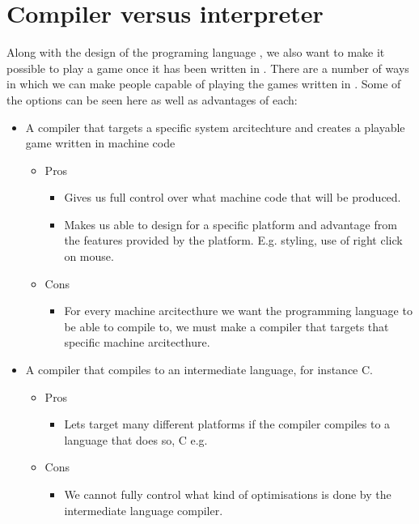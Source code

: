 \section{Compiler versus interpreter}

Along with the design of the programing language \productname{}, we also want to make it possible to play a game once it has been written in \productname{}. There are a number of ways in which we can make people capable of playing the games written in \productname{}. Some of the options can be seen here as well as advantages of each:
\begin{itemize}[noitemsep]
\item A \productname{} compiler that targets a specific system arcitechture and creates a playable game written in machine code
	\begin{itemize}[noitemsep]
	\item Pros
		\begin{itemize}[noitemsep]
		\item Gives us full control over what machine code that will be produced.
		\item Makes us able to design for a specific platform and advantage from the features provided by the platform. E.g. styling, use of right click on mouse.
		\end{itemize}
	\item Cons
		\begin{itemize}[noitemsep]
		\item For every machine arcitecthure we want the \productname{} programming language to be able to compile to, we must make a compiler that targets that specific machine arcitecthure.
		\end{itemize}
	\end{itemize}
\item A \productname{} compiler that compiles to an intermediate language, for instance C.
	\begin{itemize}[noitemsep]
	\item Pros
		\begin{itemize}
		\item Lets \productname{} target many different platforms if the compiler compiles to a language that does so, C e.g.
		\end{itemize}
	\item Cons
		\begin{itemize}[noitemsep]
		\item We cannot fully control what kind of optimisations is done by the intermediate language compiler.

\end{itemize}
\end{itemize}
\end{itemize}
